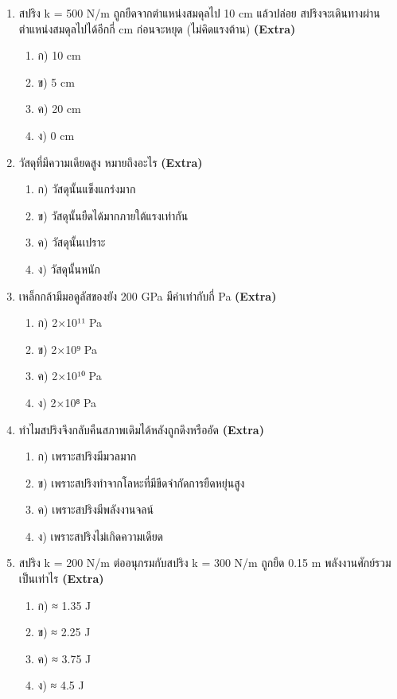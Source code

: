 \documentclass[12pt]{article}
\begin{document}
\begin{enumerate}[label=\arabic*.]
\begin{enumerate}[label=)]
\item ข) ΔL = FL/(AY)
\item ค) ΔL = FAY/L
\item ง) ΔL = YAF/L
\end{enumerate}
\item สปริง k = 500 N/m ถูกยืดจากตำแหน่งสมดุลไป 10 cm แล้วปล่อย สปริงจะเดินทางผ่านตำแหน่งสมดุลไปได้อีกกี่ cm ก่อนจะหยุด (ไม่คิดแรงต้าน) \hfill \textbf{\small (Extra)}
\begin{enumerate}[label=)]
\item ก) 10 cm
\item ข) 5 cm
\item ค) 20 cm
\item ง) 0 cm
\end{enumerate}
\item วัสดุที่มีความเดียดสูง หมายถึงอะไร \hfill \textbf{\small (Extra)}
\begin{enumerate}[label=)]
\item ก) วัสดุนั้นแข็งแกร่งมาก
\item ข) วัสดุนั้นยืดได้มากภายใต้แรงเท่ากัน
\item ค) วัสดุนั้นเปราะ
\item ง) วัสดุนั้นหนัก
\end{enumerate}
\item เหล็กกล้ามีมอดูลัสของยัง 200 GPa มีค่าเท่ากับกี่ Pa \hfill \textbf{\small (Extra)}
\begin{enumerate}[label=)]
\item ก) 2×10¹¹ Pa
\item ข) 2×10⁹ Pa
\item ค) 2×10¹⁰ Pa
\item ง) 2×10⁸ Pa
\end{enumerate}
\item ทำไมสปริงจึงกลับคืนสภาพเดิมได้หลังถูกดึงหรืออัด \hfill \textbf{\small (Extra)}
\begin{enumerate}[label=)]
\item ก) เพราะสปริงมีมวลมาก
\item ข) เพราะสปริงทำจากโลหะที่มีขีดจำกัดการยืดหยุ่นสูง
\item ค) เพราะสปริงมีพลังงานจลน์
\item ง) เพราะสปริงไม่เกิดความเดียด
\end{enumerate}
\item สปริง k = 200 N/m ต่ออนุกรมกับสปริง k = 300 N/m ถูกยืด 0.15 m พลังงานศักย์รวมเป็นเท่าไร \hfill \textbf{\small (Extra)}
\begin{enumerate}[label=)]
\item ก) ≈ 1.35 J
\item ข) ≈ 2.25 J
\item ค) ≈ 3.75 J
\item ง) ≈ 4.5 J
\end{enumerate}
\end{enumerate}
\end{document}
